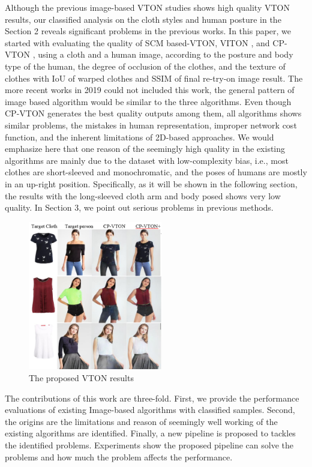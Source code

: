 Although the previous image-based VTON studies shows high quality VTON results, our classified analysis on the cloth styles and human posture in the Section 2 reveals significant problems in the previous works. In this paper, we started with evaluating the quality of SCM\cite{BelongieMP02} based-VTON, VITON \cite{Han2017VITONAI}, and CP-VTON \cite{Wang2018TowardCI}, using a cloth and a human image, according to the posture and body type of the human, the degree of occlusion of the clothes, and the texture of clothes with IoU of warped clothes and SSIM of final re-try-on image result. The more recent works in 2019 could not included this work, the general pattern of image based algorithm would be similar to the three algorithms. Even though CP-VTON generates the best quality outputs among them, all algorithms shows similar problems, the mistakes in human representation, improper network cost function, and the inherent limitations of 2D-based approaches.   
%
We would emphasize here that one reason of the seemingly high quality in the existing algorithms are mainly due to the dataset with low-complexity bias, i.e., most clothes are short-sleeved  and monochromatic, and the poses of humans are mostly in an up-right position. Specifically, as it will be shown in the following section, the results with the long-sleeved cloth arm and body posed shows very low quality. In Section 3, we point out serious problems in previous methods.


\begin{figure}
\centering
\includegraphics[height=6.5cm, scale=1]{figures/cpvton_cpvton+keyresult.png}   %
\caption{The proposed VTON results}
\label{fig:cpvton_cpvton+keyresult}
\end{figure}

The contributions of this work are three-fold. First, we provide the performance evaluations of existing Image-based algorithms with classified samples. Second, the origins are the limitations and reason of seemingly well working of the existing algorithms are  identified. Finally, a new pipeline is proposed to tackles the identified problems. Experiments show the proposed pipeline can solve the  problems and how much the problem affects the performance. 

